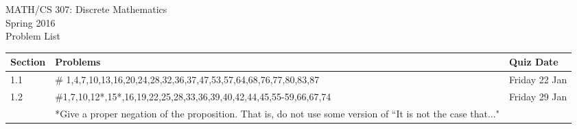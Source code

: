 \documentclass[11pt]{article}
\begin{document}
\begin{center}MATH/CS 307:  Discrete Mathematics \\ Spring 2016 \\ Problem List\end{center}

\hrulefill

\begin{tabular}{|p{1.6cm}|p{12cm}|p{3cm}|}
\hline
Section & Problems & Quiz Date\\
\hline \hline
1.1 & \# 1,4,7,10,13,16,20,24,28,32,36,37,47,53,57,64,68,76,77,80,83,87& Friday 22 Jan \\
\hline
1.2 & \#1,7,10,12*,15*,16,19,22,25,28,33,36,39,40,42,44,45,55-59,66,67,74 & Friday 29 Jan \\
&*Give a proper negation of the proposition. That is, do not use some version of ``It is not the case that..."&\\
\hline
\end{tabular}
\end{document}
